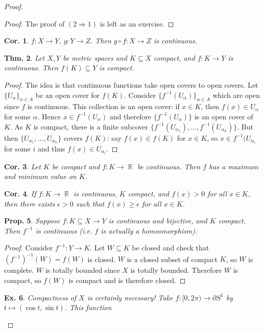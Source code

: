\documentclass[12pt, a4paper]{book}
\DeclareMathOperator{\R}{\mathbb{R}}
\newtheorem{theorem}{Thm.}[section]
\newtheorem{corollary}[theorem]{Cor.}
\newtheorem{proposition}[theorem]{Prop.}
\newtheorem{example}[theorem]{Ex.}
\theoremstyle{nonumberplain}
\newtheorem{proof}{Proof}
\begin{document}
\begin{proof}
\begin{proof}
    The proof of $(2\Rightarrow 1)$ is left as an exercise.
\end{proof}
\begin{corollary}
    $f:X\to Y$, $g:Y\to Z$. Then $g\circ f:X\to Z$ is continuous.
\end{corollary}
\begin{theorem}
    Let $X,Y$ be metric spaces and $K\subseteq X$ compact, and $f:K\to Y$ is continuous. Then $f(K)\subseteq Y$ is compact.
\end{theorem}
\begin{proof}
    The idea is that continuous functions take open covers to open covers. Let $\{U_\alpha\}_{\alpha\in A}$ be an open
    cover for $f(K)$. Consider $\{f^{-1}(U_\alpha)\}_{\alpha\in A}$ which are open since $f$ is continuous. This collection
    is an open cover: if $x\in K$, then $f(x)\in U_\alpha$ for some $\alpha$. Hence $x\in f^{-1}(U_\alpha)$ and therefore
    $\{f^{-1}(U_\alpha)\}$ is an open cover of $K$. As $K$ is compact, there is a finite subcover $\{f^{-1}(U_{\alpha_1}),\ldots,f^{-1}(U_{\alpha_n})\}$.
    But then $\{U_{\alpha_1},\ldots,U_{\alpha_n}\}$ covers $f(K)$: say $f(x)\in f(K)$ for $x\in K$, so $x\in f^{-1}(U_{\alpha_i}$
    for some $i$ and thus $f(x)\in U_{\alpha_i}$.
\end{proof}
\begin{corollary}
    Let $K$ be compact and $f:K\to\R$ be continuous. Then $f$ has a maximum and minimum value on $K$.
\end{corollary}
\begin{corollary}
    If $f:K\to\R$ is continuous, $K$ compact, and $f(x)>0$ for all $x\in K$, then there exists $\epsilon>0$ such that
    $f(x)\geq\epsilon$ for all $x\in K$.
\end{corollary}
\begin{proposition}
    Suppose $f:K\subseteq X\to Y$ is continuous and bijective, and $K$ compact. Then $f^{-1}$ is continuous (i.e. $f$
    is actually a homeomorphism).
\end{proposition}
\begin{proof}
    Consider $f^{-1}:Y\to K$. Let $W\subseteq K$ be closed and check that $(f^{-1})^{-1}(W)=f(W)$ is closed. $W$ is a
    closed subset of compact $K$, so $W$ is complete. $W$ is totally bounded since $X$ is totally bounded. Therefore
    $W$ is compact, so $f(W)$ is compact and is therefore closed.
\end{proof}
\begin{example}
    Compactness of $X$ is certainly necessary! Take $f:[0,2\pi)\to\partial S^1$ by $t\mapsto(\cos t,\sin t)$. This function

\end{example}
\end{proof}
\end{document}
